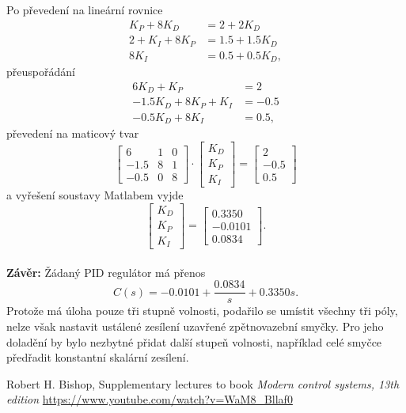 \documentclass[twoside]{article}
\begin{document}
Po převedení na lineární rovnice
\begin{equation}
	\begin{split}
		K_P + 8K_D &= 2 + 2K_D \\
		2 + K_I + 8K_P &= 1.5 + 1.5 K_D\\
		8K_I &= 0.5 +0.5 K_D,
	\end{split}
\end{equation}
přeuspořádání
\begin{equation}
	\begin{split}
		6K_D + K_P &= 2 \\
		- 1.5 K_D + 8K_P  + K_I &= -0.5\\
		- 0.5K_D + 8K_I &= 0.5,
	\end{split}
\end{equation}
převedení na maticový tvar
\begin{equation}
	\begin{bmatrix}
		6 & 1 & 0 \\
		-1.5 & 8 & 1 \\
		-0.5 & 0 &8  
		
	\end{bmatrix} \cdot \begin{bmatrix}
		K_D \\
		K_P \\
		K_I
	\end{bmatrix} = \begin{bmatrix}
		2 \\
		-0.5 \\
		0.5
	\end{bmatrix}
\end{equation}
a vyřešení soustavy Matlabem vyjde 
\begin{equation}
	\begin{bmatrix}
		K_D \\
		K_P \\
		K_I
	\end{bmatrix} = 
	\begin{bmatrix}
		0.3350 \\
		-0.0101 \\
		0.0834
	\end{bmatrix}.
\end{equation} \\
\textbf{Závěr:}
Žádaný PID regulátor má přenos
\begin{equation}
	C(s) = -0.0101 + \frac{0.0834}{s} + 0.3350 s.
\end{equation}
Protože má úloha pouze tři stupně volnosti, podařilo se umístit všechny tři póly, nelze však nastavit ustálené zesílení
uzavřené zpětnovazební smyčky. Pro jeho doladění by bylo nezbytné přidat další stupeň volnosti, například
celé smyčce předřadit konstantní skalární zesílení.

\begin{thebibliography}{9}

	Robert H. Bishop, Supplementary lectures to book \emph{Modern control systems, 13th edition} \url{https://www.youtube.com/watch?v=WaM8_Bllaf0}

\end{thebibliography}
\end{document}
